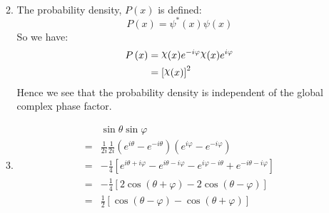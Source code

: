 \documentclass[10pt]{article}
\DeclareRobustCommand{\rchi}{{\mathpalette\irchi\relax}}
\newcommand{\irchi}[2]{\raisebox{\depth}{$#1\chi$}} %
\begin{document}
\begin{enumerate}
\begin{enumerate}
\begin{align*}
      \end{align*}
    \item 
      The probability density, $ P \left( x \right) $ is defined:
      \begin{equation*}
        P \left( x \right) = \psi ^* \left( x \right)\psi \left( x \right)
      \end{equation*}
      So we have:
      \begin{align*}
        P \left( x \right) &= \rchi (x) e ^ {-i \varphi } \rchi (x) e ^ {i \varphi } \\
                           &= \left[ \rchi (x)  \right] ^2
      \end{align*}
      Hence we see that the probability density is independent of the global complex phase factor.
    \item 
      \begin{align*}
        & \sin \theta \sin \varphi \\
        = & \frac{1}{2i}\frac{1}{2i}\left( e ^ {i\theta }-e ^ {-i\theta } \right) \left( e ^ {i\varphi }-e ^ {-i\varphi } \right) \\
        =& -\frac{1}{4} \left[ e ^ {i\theta +i\varphi } - e ^ {i\theta -i\varphi } - e ^ {i\varphi -i\theta } + e ^ {-i\theta -i\varphi } \right] \\
        =& -\frac{1}{4} \left[ 2\cos \left( \theta +\varphi  \right) - 2\cos \left( \theta -\varphi  \right) \right] \\
        =& \frac{1}{2} \left[ \cos \left( \theta -\varphi  \right) - \cos \left( \theta +\varphi  \right) \right]
      \end{align*}
    \end{enumerate}
\end{enumerate}
\end{document}
